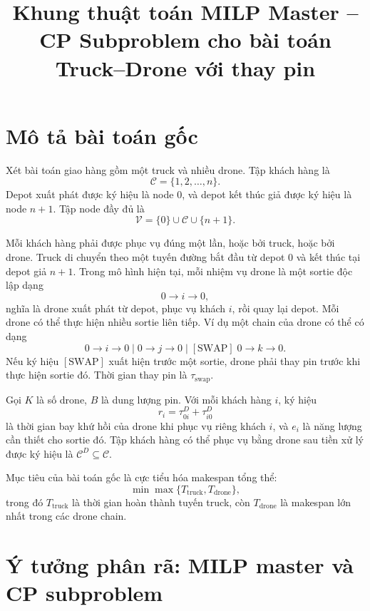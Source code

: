 \documentclass[12pt,a4paper]{article}
\title{Khung thuật toán MILP Master -- CP Subproblem cho bài toán Truck--Drone với thay pin}
\author{}
\date{}
\newcommand{\C}{\mathcal{C}}
\newcommand{\CD}{\mathcal{C}^{D}}
\newcommand{\V}{\mathcal{V}}
\begin{document}
\maketitle

\section{Mô tả bài toán gốc}
\label{sec:original-problem}

Xét bài toán giao hàng gồm một truck và nhiều drone. Tập khách hàng là
\[
    \C=\{1,2,\ldots,n\}.
\]
Depot xuất phát được ký hiệu là node $0$, và depot kết thúc giả được ký hiệu là node $n+1$.
Tập node đầy đủ là
\[
    \V=\{0\}\cup \C\cup \{n+1\}.
\]

Mỗi khách hàng phải được phục vụ đúng một lần, hoặc bởi truck, hoặc bởi drone. Truck di chuyển theo một tuyến đường bắt đầu từ depot $0$ và kết thúc tại depot giả $n+1$. Trong mô hình hiện tại, mỗi nhiệm vụ drone là một sortie độc lập dạng
\[
    0\rightarrow i\rightarrow 0,
\]
nghĩa là drone xuất phát từ depot, phục vụ khách $i$, rồi quay lại depot. Mỗi drone có thể thực hiện nhiều sortie liên tiếp. Ví dụ một chain của drone có thể có dạng
\[
    0\to i\to 0\; |\; 0\to j\to 0\; |\; [\mathrm{SWAP}]\;0\to k\to 0.
\]
Nếu ký hiệu $[\mathrm{SWAP}]$ xuất hiện trước một sortie, drone phải thay pin trước khi thực hiện sortie đó. Thời gian thay pin là $\tau_{\mathrm{swap}}$.

Gọi $K$ là số drone, $B$ là dung lượng pin. Với mỗi khách hàng $i$, ký hiệu
\[
    r_i=\tau^D_{0i}+\tau^D_{i0}
\]
là thời gian bay khứ hồi của drone khi phục vụ riêng khách $i$, và $e_i$ là năng lượng cần thiết cho sortie đó. Tập khách hàng có thể phục vụ bằng drone sau tiền xử lý được ký hiệu là $\CD\subseteq \C$.

Mục tiêu của bài toán gốc là cực tiểu hóa makespan tổng thể:
\begin{equation}
    \min \max\{T_{\mathrm{truck}},T_{\mathrm{drone}}\},
    \label{eq:original-objective}
\end{equation}
trong đó $T_{\mathrm{truck}}$ là thời gian hoàn thành tuyến truck, còn $T_{\mathrm{drone}}$ là makespan lớn nhất trong các drone chain.

\section{Ý tưởng phân rã: MILP master và CP subproblem}
\label{sec:decomposition}
\end{document}

